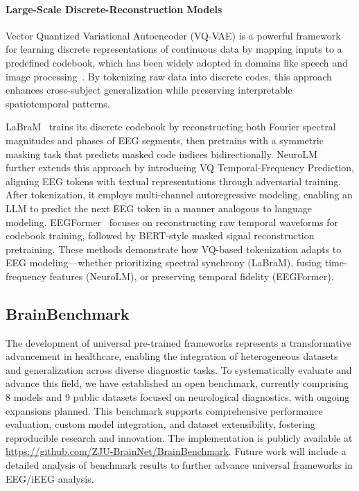 \paragraph{Large-Scale Discrete-Reconstruction Models}
Vector Quantized Variational Autoencoder (VQ-VAE) is a powerful framework for learning discrete representations of continuous data by mapping inputs to a predefined codebook, which has been widely adopted in domains like speech and image processing~\cite{van2017neural}. By tokenizing raw data into discrete codes, this approach enhances cross-subject generalization while preserving interpretable spatiotemporal patterns.

LaBraM~\cite{jiang2024large} trains its discrete codebook by reconstructing both Fourier spectral magnitudes and phases of EEG segments, then pretrains with a symmetric masking task that predicts masked code indices bidirectionally.
NeuroLM~\cite{jiang2024neurolm} further extends this approach by introducing VQ Temporal-Frequency Prediction, aligning EEG tokens with textual representations through adversarial training. After tokenization, it employs multi-channel autoregressive modeling, enabling an LLM to predict the next EEG token in a manner analogous to language modeling.
EEGFormer~\cite{chen2024eegformer} focuses on reconstructing raw temporal waveforms for codebook training, followed by BERT-style masked signal reconstruction pretraining.
These methods demonstrate how VQ-based tokenization adapts to EEG modeling—whether prioritizing spectral synchrony (LaBraM), fusing time-frequency features (NeuroLM), or preserving temporal fidelity (EEGFormer).

\subsection{BrainBenchmark}
The development of universal pre-trained frameworks represents a transformative advancement in healthcare, enabling the integration of heterogeneous datasets and generalization across diverse diagnostic tasks.
To systematically evaluate and advance this field, we have established an open benchmark, currently comprising 8 models and 9 public datasets focused on neurological diagnostics, with ongoing expansions planned. 
This benchmark supports comprehensive performance evaluation, custom model integration, and dataset extensibility, fostering reproducible research and innovation. The implementation is publicly available at \href{https://github.com/ZJU-BrainNet/BrainBenchmark}{https://github.com/ZJU-BrainNet/BrainBenchmark}. 
Future work will include a detailed analysis of benchmark results to further advance universal frameworks in EEG/iEEG analysis.